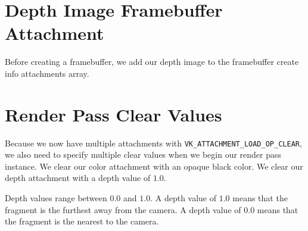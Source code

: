 \begin{minipage}{\linewidth}{\noindent}
    
\end{minipage}

\section{Depth Image Framebuffer Attachment}

Before creating a framebuffer, we add our depth image to the framebuffer
create info attachments array.

\begin{minipage}{\linewidth}{\noindent}
    
\end{minipage}

\section{Render Pass Clear Values}

Because we now have multiple attachments with
\texttt{VK\_ATTACHMENT\_LOAD\_OP\_CLEAR}, we also need to specify multiple
clear values when we begin our render pass instance.
We clear our color attachment with an opaque black color.
We clear our depth attachment with a depth value of $1.0$.

\begin{minipage}{\linewidth}{\noindent}
    
\end{minipage}

Depth values range between $0.0$ and $1.0$.
A depth value of $1.0$ means that the fragment is the furthest away from
the camera.
A depth value of $0.0$ means that the fragment is the nearest to
the camera.

